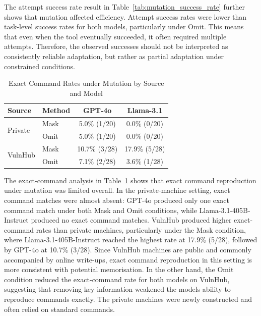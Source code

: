 \documentclass[acmtog]{acmart}
\begin{document}
The attempt success rate result in Table~\ref{tab:mutation_success_rate} further shows that mutation affected efficiency. Attempt success rates were lower than task-level success rates for both models, particularly under Omit. This means that even when the tool eventually succeeded, it often required multiple attempts. Therefore, the observed successes should not be interpreted as consistently reliable adaptation, but rather as partial adaptation under constrained conditions.

\begin{table}[htbp]
  \centering
  \caption{Exact Command Rates under Mutation by Source and Model}
  \label{tab:mutation_exact_command_rate}
  \begin{tabular}{llcc}
    \hline
    \textbf{Source} & \textbf{Method} & \textbf{GPT-4o} & \textbf{Llama-3.1} \\
    \hline
    \multirow{2}{*}{Private}
    & Mask & 5.0\% (1/20) & 0.0\% (0/20) \\
    & Omit & 5.0\% (1/20) & 0.0\% (0/20) \\
    \hline
    \multirow{2}{*}{VulnHub}
    & Mask & 10.7\% (3/28) & 17.9\% (5/28) \\
    & Omit & 7.1\% (2/28) & 3.6\% (1/28) \\
    \hline
  \end{tabular}
\end{table}

The exact-command analysis in Table~\ref{tab:mutation_exact_command_rate} shows that exact command reproduction under mutation was limited overall. In the private-machine setting, exact command matches were almost absent: GPT-4o produced only one exact command match under both Mask and Omit conditions, while Llama-3.1-405B-Instruct produced no exact command matches. VulnHub produced higher exact-command rates than private machines, particularly under the Mask condition, where Llama-3.1-405B-Instruct reached the highest rate at 17.9\% (5/28), followed by GPT-4o at 10.7\% (3/28). Since VulnHub machines are public and commonly accompanied by online write-ups, exact command reproduction in this setting is more consistent with potential memorisation. In the other hand, the Omit condition reduced the exact-command rate for both models on VulnHub, suggesting that removing key information weakened the models ability to reproduce commands exactly. The private machines were newly constructed and often relied on standard commands.
\end{document}
